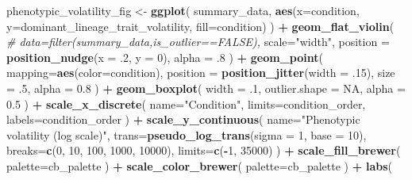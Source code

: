 \documentclass[]{book}
\newenvironment{Shaded}{\begin{snugshade}}{\end{snugshade}}
\newcommand{\CommentTok}[1]{\textcolor[rgb]{0.56,0.35,0.01}{\textit{#1}}}
\newcommand{\DataTypeTok}[1]{\textcolor[rgb]{0.13,0.29,0.53}{#1}}
\newcommand{\DecValTok}[1]{\textcolor[rgb]{0.00,0.00,0.81}{#1}}
\newcommand{\FloatTok}[1]{\textcolor[rgb]{0.00,0.00,0.81}{#1}}
\newcommand{\KeywordTok}[1]{\textcolor[rgb]{0.13,0.29,0.53}{\textbf{#1}}}
\newcommand{\NormalTok}[1]{#1}
\newcommand{\OperatorTok}[1]{\textcolor[rgb]{0.81,0.36,0.00}{\textbf{#1}}}
\newcommand{\OtherTok}[1]{\textcolor[rgb]{0.56,0.35,0.01}{#1}}
\newcommand{\StringTok}[1]{\textcolor[rgb]{0.31,0.60,0.02}{#1}}
\begin{document}
\begin{Shaded}
\begin{Highlighting}[]
{{{{\NormalTok{phenotypic_volatility_fig <-}\StringTok{ }\KeywordTok{ggplot}\NormalTok{(}
\NormalTok{    summary_data,}
    \KeywordTok{aes}\NormalTok{(}\DataTypeTok{x=}\NormalTok{condition, }\DataTypeTok{y=}\NormalTok{dominant_lineage_trait_volatility, }\DataTypeTok{fill=}\NormalTok{condition)}
\NormalTok{  ) }\OperatorTok{+}
\StringTok{  }\KeywordTok{geom_flat_violin}\NormalTok{(}
    \CommentTok{# data=filter(summary_data,is_outlier==FALSE),}
    \DataTypeTok{scale=}\StringTok{"width"}\NormalTok{,}
    \DataTypeTok{position =} \KeywordTok{position_nudge}\NormalTok{(}\DataTypeTok{x =} \FloatTok{.2}\NormalTok{, }\DataTypeTok{y =} \DecValTok{0}\NormalTok{),}
    \DataTypeTok{alpha =} \FloatTok{.8}
\NormalTok{  ) }\OperatorTok{+}
\StringTok{  }\KeywordTok{geom_point}\NormalTok{(}
    \DataTypeTok{mapping=}\KeywordTok{aes}\NormalTok{(}\DataTypeTok{color=}\NormalTok{condition),}
    \DataTypeTok{position =} \KeywordTok{position_jitter}\NormalTok{(}\DataTypeTok{width =} \FloatTok{.15}\NormalTok{),}
    \DataTypeTok{size =} \FloatTok{.5}\NormalTok{,}
    \DataTypeTok{alpha =} \FloatTok{0.8}
\NormalTok{  ) }\OperatorTok{+}
\StringTok{  }\KeywordTok{geom_boxplot}\NormalTok{(}
    \DataTypeTok{width =} \FloatTok{.1}\NormalTok{,}
    \DataTypeTok{outlier.shape =} \OtherTok{NA}\NormalTok{,}
    \DataTypeTok{alpha =} \FloatTok{0.5}
\NormalTok{  ) }\OperatorTok{+}
\StringTok{  }\KeywordTok{scale_x_discrete}\NormalTok{(}
    \DataTypeTok{name=}\StringTok{"Condition"}\NormalTok{,}
    \DataTypeTok{limits=}\NormalTok{condition_order,}
    \DataTypeTok{labels=}\NormalTok{condition_order}
\NormalTok{  ) }\OperatorTok{+}
\StringTok{  }\KeywordTok{scale_y_continuous}\NormalTok{(}
    \DataTypeTok{name=}\StringTok{"Phenotypic volatility (log scale)"}\NormalTok{,}
    \DataTypeTok{trans=}\KeywordTok{pseudo_log_trans}\NormalTok{(}\DataTypeTok{sigma =} \DecValTok{1}\NormalTok{, }\DataTypeTok{base =} \DecValTok{10}\NormalTok{),}
    \DataTypeTok{breaks=}\KeywordTok{c}\NormalTok{(}\DecValTok{0}\NormalTok{, }\DecValTok{10}\NormalTok{, }\DecValTok{100}\NormalTok{, }\DecValTok{1000}\NormalTok{, }\DecValTok{10000}\NormalTok{),}
    \DataTypeTok{limits=}\KeywordTok{c}\NormalTok{(}\OperatorTok{-}\DecValTok{1}\NormalTok{, }\DecValTok{35000}\NormalTok{)}
\NormalTok{  ) }\OperatorTok{+}
\StringTok{  }\KeywordTok{scale_fill_brewer}\NormalTok{(}
    \DataTypeTok{palette=}\NormalTok{cb_palette}
\NormalTok{  ) }\OperatorTok{+}
\StringTok{  }\KeywordTok{scale_color_brewer}\NormalTok{(}
    \DataTypeTok{palette=}\NormalTok{cb_palette}
\NormalTok{  ) }\OperatorTok{+}
\StringTok{  }\KeywordTok{labs}\NormalTok{(}
}}}}
\end{Highlighting}
\end{Shaded}
\end{document}

